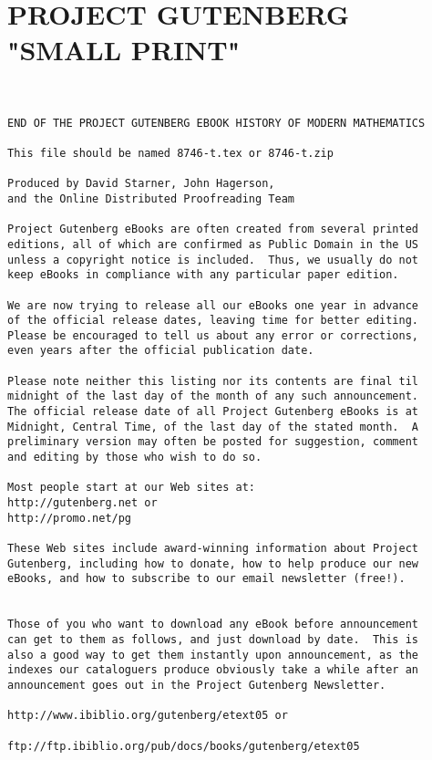 \documentclass[oneside]{book}
\begin{document}
{\newpage



\chapter{PROJECT GUTENBERG "SMALL PRINT"}
\small
{}
\begin{verbatim}


END OF THE PROJECT GUTENBERG EBOOK HISTORY OF MODERN MATHEMATICS

This file should be named 8746-t.tex or 8746-t.zip

Produced by David Starner, John Hagerson,
and the Online Distributed Proofreading Team

Project Gutenberg eBooks are often created from several printed
editions, all of which are confirmed as Public Domain in the US
unless a copyright notice is included.  Thus, we usually do not
keep eBooks in compliance with any particular paper edition.

We are now trying to release all our eBooks one year in advance
of the official release dates, leaving time for better editing.
Please be encouraged to tell us about any error or corrections,
even years after the official publication date.

Please note neither this listing nor its contents are final til
midnight of the last day of the month of any such announcement.
The official release date of all Project Gutenberg eBooks is at
Midnight, Central Time, of the last day of the stated month.  A
preliminary version may often be posted for suggestion, comment
and editing by those who wish to do so.

Most people start at our Web sites at:
http://gutenberg.net or
http://promo.net/pg

These Web sites include award-winning information about Project
Gutenberg, including how to donate, how to help produce our new
eBooks, and how to subscribe to our email newsletter (free!).


Those of you who want to download any eBook before announcement
can get to them as follows, and just download by date.  This is
also a good way to get them instantly upon announcement, as the
indexes our cataloguers produce obviously take a while after an
announcement goes out in the Project Gutenberg Newsletter.

http://www.ibiblio.org/gutenberg/etext05 or

ftp://ftp.ibiblio.org/pub/docs/books/gutenberg/etext05


\end{verbatim}}
\end{document}
